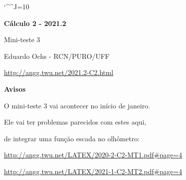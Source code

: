 \documentclass[oneside,12pt]{article}
\begin{document}
\catcode`\^^J=10
%
\pu
\def\pictgridstyle{\color{GrayPale}\linethickness{0.3pt}}
\def\pictaxesstyle{\linethickness{0.5pt}}



\def\u#1{\par{\footnotesize \url{#1}}}

\def\drafturl{http://angg.twu.net/LATEX/2021-2-C2.pdf}
\def\drafturl{http://angg.twu.net/2021.2-C2.html}
\def\draftfooter{\tiny \href{\drafturl}{\jobname{}} \ColorBrown{\shorttoday{} \hours}}



%

\thispagestyle{empty}

\begin{center}

\vspace*{1.2cm}

{\bf \Large Cálculo 2 - 2021.2}

\bsk

Mini-teste 3

\bsk

Eduardo Ochs - RCN/PURO/UFF

\url{http://angg.twu.net/2021.2-C2.html}

\end{center}

\newpage

{\bf Avisos}

O mini-teste 3 vai acontecer no início de janeiro.

Ele vai ter problemas parecidos com estes aqui,

de integrar uma função escada no olhômetro:


\ssk

{\footnotesize

\url{http://angg.twu.net/LATEX/2020-2-C2-MT1.pdf#page=4}

\url{http://angg.twu.net/LATEX/2021-1-C2-MT2.pdf#page=4}

}
\end{document}
